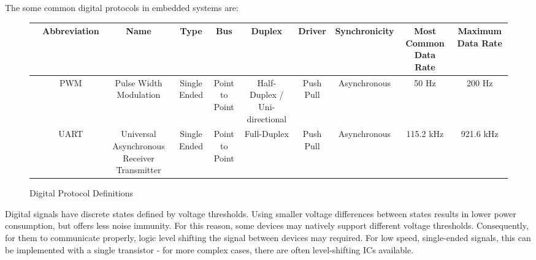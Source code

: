 \documentclass[main.tex]{subfiles}
\begin{document}
\begin{itemize}
\end{itemize}

The some common digital protocols in embedded systems are:
\begin{figure}[h!]
    \centering
    \begin{tabular}{|c|c|c|c|c|c|c|c|c|c|}
        \hline 
        & Abbreviation & Name & Type & Bus & Duplex & Driver & Synchronicity & Most Common Data Rate & Maximum Data Rate \\ \hline
        & PWM & Pulse Width Modulation & Single Ended & Point to Point & Half-Duplex / Uni-directional & Push Pull & Asynchronous & 50 Hz & 200 Hz \\ \hline
        & UART & Universal Asynchronous Receiver Transmitter & Single Ended & Point to Point & Full-Duplex & Push Pull & Asynchronous & 115.2 kHz & 921.6 kHz \\ \hline

    \end{tabular}
    \caption{Digital Protocol Definitions}
    \label{fig:digital_protocols}
\end{figure}

\noindent Digital signals have discrete states defined by voltage thresholds. Using smaller voltage differences between states results in lower power consumption, but offers less noise immunity. For this reason, some devices may natively support different voltage thresholds. Consequently, for them to communicate properly, logic level shifting the signal between devices may required. For low speed, single-ended signals, this can be implemented with a single transistor - for more complex cases, there are often level-shifting ICs available. 
\end{document}
